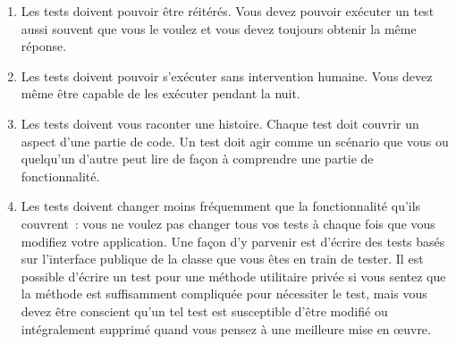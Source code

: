 \documentclass[a4paper,10pt,twoside]{book}
\begin{document}
\begin{enumerate}
\item Les tests doivent pouvoir être réitérés. Vous devez pouvoir exécuter un test aussi souvent 
que vous le voulez et vous devez toujours obtenir la même réponse.


\item Les tests doivent pouvoir s'exécuter sans intervention humaine. Vous devez même être capable 
de les exécuter pendant la nuit.


\item Les tests doivent vous raconter une histoire.  Chaque test doit couvrir un aspect d'une partie 
de code. Un test doit agir comme un scénario que vous ou quelqu'un d'autre peut lire de façon à comprendre 
une partie de fonctionnalité.\label{prop:oneAspect} 


\item Les tests doivent changer moins fréquemment que la fonctionnalité qu'ils couvrent~: vous 
ne voulez pas changer tous vos tests à chaque fois que vous modifiez votre application. 
Une façon d'y parvenir est d'écrire des tests basés sur l'interface publique de la classe 
que vous êtes en train de tester. Il est possible d'écrire un test pour une méthode utilitaire 
privée si vous sentez que la méthode est suffisamment compliquée pour nécessiter le test, 
mais vous devez être conscient qu'un tel test est susceptible d'être modifié ou intégralement 
supprimé quand vous pensez à une meilleure mise en {\oe}uvre.
\end{enumerate}
\end{document}
